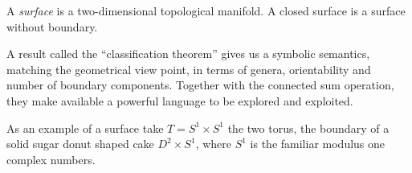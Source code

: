 \documentclass[12pt]{article}
\begin{document}
A \emph{surface} is a two-dimensional topological manifold.
A closed surface is a surface without boundary.

A result called the ``classification theorem'' gives us a symbolic semantics, matching the geometrical view point, in terms of genera, orientability and number of boundary components. Together with the connected sum operation, they make available a powerful language to be explored and exploited.

As an example of a surface take $T=S^1\times S^1$ the two torus, the boundary of a solid sugar donut shaped cake $D^2\times S^1$, where $S^1$ is the familiar modulus one complex numbers.

\end{document}
